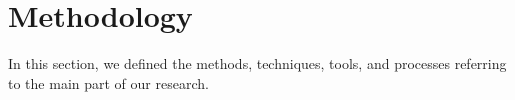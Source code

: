 \newpage

\section{Methodology}
\label{sec:methodology}

In this section, we defined the methods, techniques, tools, and processes referring to the main part of our research.






